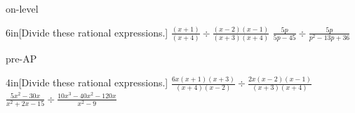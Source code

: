 \begin{taggedblock}{on-level}
    \begin{my2Problems}{6in}[Divide these rational expressions.]
        {
            $
            \frac
            {(x+1)}
            {(x+4)}
            \div
            \frac
            {(x-2)(x-1)}
            {(x+3)(x+4)}
            $
        }
        {
            $
            \frac
            {5p}
            {5p-45}
            \div
            \frac
            {5p}
            {p^2-13p+36}
            $
        }
    \end{my2Problems}
\end{taggedblock}
\begin{taggedblock}{pre-AP}
    \begin{my2Problems}{4in}[Divide these rational expressions.]
        {
            $
            \frac
            {6x(x+1)(x+3)}
            {(x+4)(x-2)}
            \div
            \frac
            {2x(x-2)(x-1)}
            {(x+3)(x+4)}
            $
        }
        {
            $
            \frac
            {5x^2 -30x}
            {x^2 + 2x - 15}
            \div
            \frac
            {10x^3 - 40x^2 -120x}
            {x^2 - 9}
            $
        }
    \end{my2Problems}
\end{taggedblock}
